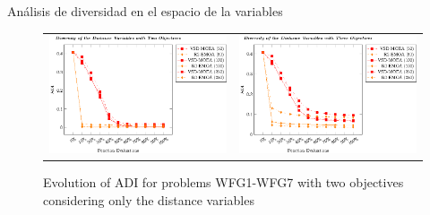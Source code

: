 \documentclass{beamer}
\begin{document}
\begin{frame}{Análisis de diversidad en el espacio de la variables}
\begin{figure}
\centering
\begin{tabular}{cc}
\includegraphics[scale=0.6]{Images/Graphic-Diversity_2obj_tikz-figure1.eps} & \includegraphics[scale=0.6]{Images/Graphic-Diversity_3obj_tikz-figure1.eps} 
\end{tabular}
\caption{Evolution of ADI for problems WFG1-WFG7 with two objectives considering only the distance variables}
\end{figure}
\end{frame}
\end{document}
